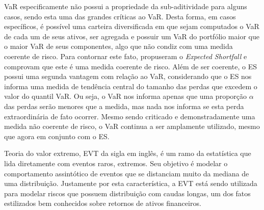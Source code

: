 \documentclass[1p]{elsarticle}
\theoremstyle{definition}
\begin{document}
VaR especificamente não possui a propriedade da sub-aditividade para alguns casos, sendo esta uma das grandes críticas ao VaR. Desta forma, em casos específicos, é possível uma carteira diversificada em que sejam computados o VaR de cada um de seus ativos, ser agregada e possuir um VaR do portfólio maior que o maior VaR de seus componentes, algo que não condiz com uma medida coerente de risco. Para contornar este fato, \cite{Acerbi2002} propuseram o \emph{Expected Shortfall} e comprovam que este é uma medida coerente de risco. Além de ser coerente, o ES possui uma segunda vantagem com relação ao VaR, considerando que o ES nos informa uma medida de tendência central do tamanho das perdas que excedem o valor do quantil VaR. Ou seja, o VaR nos informa apenas que uma proporção $\alpha$ das perdas serão menores que a medida, mas nada nos informa se esta perda extraordinária de fato ocorrer. Mesmo sendo criticado e demonstradamente uma medida não coerente de risco, o VaR continua a ser amplamente utilizado, mesmo que agora em conjunto com o ES. 



Teoria do valor extremo, EVT da sigla em inglês, é um ramo da estatística que lida diretamente com eventos raros, extremos. Seu objetivo é modelar o comportamento assintótico de eventos que se distanciam muito da mediana de uma distribuição. Justamente por esta característica, a EVT está sendo utilizada para modelar riscos que possuem distribuição com caudas longas, um dos fatos estilizados bem conhecidos sobre retornos de ativos financeiros.
\end{document}

